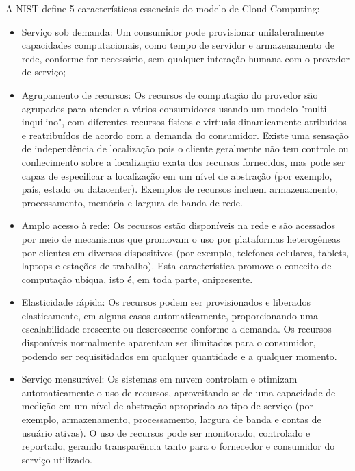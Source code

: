             A NIST define 5 características essenciais do modelo de Cloud Computing:
            \begin{itemize}
            	\item Serviço sob demanda: Um consumidor pode provisionar unilateralmente capacidades computacionais, como tempo de servidor e armazenamento de rede, conforme for necessário, sem qualquer interação humana com o provedor de serviço;
            	
            	\item Agrupamento de recursos: Os recursos de computação do provedor são agrupados para atender a vários consumidores usando um modelo "multi inquilino", com diferentes recursos físicos e virtuais dinamicamente atribuídos e reatribuídos de acordo com a demanda do consumidor. Existe uma sensação de independência de localização pois o cliente geralmente não tem controle ou conhecimento sobre a localização exata dos recursos fornecidos, mas pode ser capaz de especificar a localização em um nível de abstração (por exemplo, país, estado ou datacenter). Exemplos de recursos incluem armazenamento, processamento, memória e largura de banda de rede.
            	
            	\item Amplo acesso à rede: Os recursos estão disponíveis na rede e são acessados por meio de mecanismos que promovam o uso por plataformas heterogêneas por clientes em diversos dispositivos (por exemplo, telefones celulares, tablets, laptops e estações de trabalho). Esta característica promove o conceito de computação ubíqua, isto é, em toda parte, onipresente.
            	
            	\item Elasticidade rápida: Os recursos podem ser provisionados e liberados elasticamente, em alguns casos automaticamente, proporcionando uma escalabilidade crescente ou descrescente conforme a demanda. Os recursos disponíveis normalmente aparentam ser ilimitados para o consumidor, podendo ser requisitidados em qualquer quantidade e a qualquer momento.
            	
            	\item Serviço mensurável: Os sistemas em nuvem controlam e otimizam automaticamente o uso de recursos, aproveitando-se de uma capacidade de medição em um nível de abstração apropriado ao tipo de serviço (por exemplo, armazenamento, processamento, largura de banda e contas de usuário ativas). O uso de recursos pode ser monitorado, controlado e reportado, gerando transparência tanto para o fornecedor e consumidor do serviço utilizado.
            \end{itemize}


